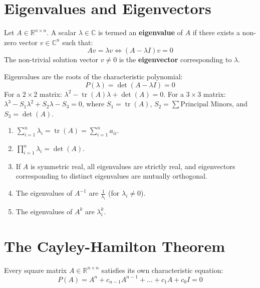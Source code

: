 \section{Eigenvalues and Eigenvectors}
\begin{definition}
Let $A \in \mathbb{R}^{n \times n}$. A scalar $\lambda \in \mathbb{C}$ is termed an \textbf{eigenvalue} of $A$ if there exists a non-zero vector $v \in \mathbb{C}^n$ such that:
\begin{equation}
Av = \lambda v \iff (A - \lambda I)v = 0
\end{equation}
The non-trivial solution vector $v \neq 0$ is the \textbf{eigenvector} corresponding to $\lambda$.
\end{definition}

\begin{theorem}
Eigenvalues are the roots of the characteristic polynomial:
\begin{equation}
P(\lambda) = \det(A - \lambda I) = 0
\end{equation}
For a $2 \times 2$ matrix: $\lambda^2 - \operatorname{tr}(A)\lambda + \det(A) = 0$.
For a $3 \times 3$ matrix: $\lambda^3 - S_1 \lambda^2 + S_2 \lambda - S_3 = 0$, where $S_1 = \operatorname{tr}(A)$, $S_2 = \sum \text{Principal Minors}$, and $S_3 = \det(A)$.
\end{theorem}

\begin{theorem}
\begin{enumerate}
    \item $\sum_{i=1}^n \lambda_i = \operatorname{tr}(A) = \sum_{i=1}^n a_{ii}$.
    \item $\prod_{i=1}^n \lambda_i = \det(A)$.
    \item If $A$ is symmetric real, all eigenvalues are strictly real, and eigenvectors corresponding to distinct eigenvalues are mutually orthogonal.
    \item The eigenvalues of $A^{-1}$ are $\frac{1}{\lambda_i}$ (for $\lambda_i \neq 0$).
    \item The eigenvalues of $A^k$ are $\lambda_i^k$.
\end{enumerate}
\end{theorem}

\section{The Cayley-Hamilton Theorem}
\begin{theorem}
Every square matrix $A \in \mathbb{R}^{n \times n}$ satisfies its own characteristic equation:
\begin{equation}
P(A) = A^n + c_{n-1}A^{n-1} + \dots + c_1 A + c_0 I = 0
\end{equation}
\end{theorem}

